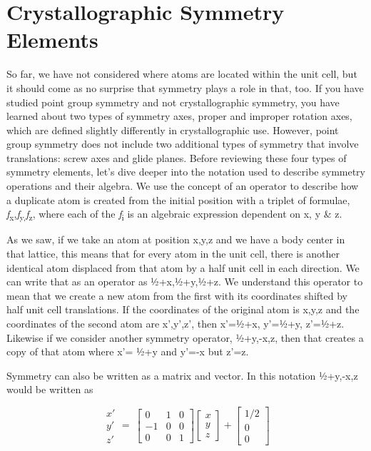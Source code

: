 \section{Crystallographic Symmetry Elements}

 So far, we have not considered where atoms are located within the unit cell, but it should come as no surprise that symmetry plays a role in that, too. If you have studied point group symmetry and not crystallographic symmetry, you have learned about two types of symmetry axes, proper and improper rotation axes, which are defined slightly differently in crystallographic use. However, point group symmetry does not include two additional types of symmetry that involve translations: screw axes and glide planes. Before reviewing these four types of symmetry elements, let’s dive deeper into the notation used to describe symmetry operations and their algebra. We use the concept of an operator to describe how a duplicate atom is created from the initial position with a triplet of formulae, \textit{f}\textsubscript{x},\textit{f}\textsubscript{y,}\textit{f}\textsubscript{z}, where each of the \textit{f}\textsubscript{i} is an algebraic expression dependent on x, y \& z. 

 As we saw, if we take an atom at position x,y,z and we have a body center in that lattice, this means that for every atom in the unit cell, there is another identical atom displaced from that atom by a half unit cell in each direction. We can write that as an operator as ½+x,½+y,½+z. We understand this operator to mean that we create a new atom from the first with its coordinates shifted by half unit cell translations. If the coordinates of the original atom is x,y,z and the coordinates of the second atom are x’,y’,z’, then x’=½+x, y’=½+y, z’=½+z. Likewise if we consider another symmetry operator, ½+y,-x,z, then that creates a copy of that atom where x’= ½+y and y’=-x but z’=z. 

 Symmetry can also be written as a matrix and vector. In this notation ½+y,-x,z would be written as 
 
$$\begin{matrix}x\prime\\y\prime\\z\prime\end{matrix}=\ \left[\begin{matrix}0&1&0\\-1&0&0\\0&0&1\end{matrix}\right]\left[\begin{matrix}x\\y\\z\end{matrix}\right]+\left[\begin{matrix}{1/2}\\0\\0\end{matrix}\right]$$

